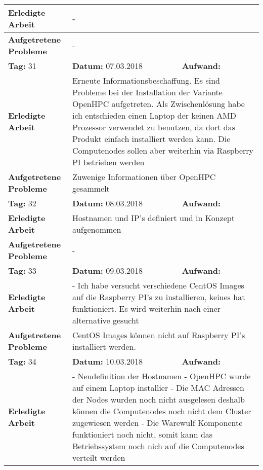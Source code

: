 \begin{longtable}{|p{5cm}|p{5cm}|p{6cm}|}
\textbf{Erledigte Arbeit} & \multicolumn{2}{p{11cm}|}{-} \\ \hline
\textbf{Aufgetretene Probleme} & \multicolumn{2}{p{11cm}|}{-} \\ \hline
\rowcolor{heading}\textbf{Tag:} 31 & \textbf{Datum:} 07.03.2018 & \textbf{Aufwand:} \\ \hline
\textbf{Erledigte Arbeit} & \multicolumn{2}{p{11cm}|}{Erneute Informationsbeschaffung. Es sind Probleme bei der Installation der Variante OpenHPC aufgetreten. Als Zwischenlösung habe ich entschieden einen Laptop der keinen AMD Prozessor verwendet zu benutzen, da dort das Produkt einfach installiert werden kann. Die Computenodes sollen aber weiterhin via Raspberry PI betrieben werden} \\ \hline
\textbf{Aufgetretene Probleme} & \multicolumn{2}{p{11cm}|}{Zuwenige Informationen über OpenHPC gesammelt} \\ \hline
\rowcolor{heading}\textbf{Tag:} 32 & \textbf{Datum:} 08.03.2018 & \textbf{Aufwand:} \\ \hline
\textbf{Erledigte Arbeit} & \multicolumn{2}{p{11cm}|}{Hostnamen und IP's definiert und in Konzept aufgenommen} \\ \hline
\textbf{Aufgetretene Probleme} & \multicolumn{2}{p{11cm}|}{-} \\ \hline
\rowcolor{heading}\textbf{Tag:} 33 & \textbf{Datum:} 09.03.2018 & \textbf{Aufwand:} \\ \hline
\textbf{Erledigte Arbeit} & \multicolumn{2}{p{11cm}|}{- Ich habe versucht verschiedene CentOS Images auf die Raspberry PI's zu installieren, keines hat funktioniert. Es wird weiterhin nach einer alternative gesucht} \\ \hline
\textbf{Aufgetretene Probleme} & \multicolumn{2}{p{11cm}|}{CentOS Images können nicht auf Raspberry PI's installiert werden.} \\ \hline
\rowcolor{heading}\textbf{Tag:} 34 & \textbf{Datum:} 10.03.2018 & \textbf{Aufwand:} \\ \hline
\textbf{Erledigte Arbeit} & \multicolumn{2}{p{11cm}|}{- Neudefinition der Hostnamen \newline
- OpenHPC wurde auf einem Laptop installier \newline
- Die MAC Adressen der Nodes wurden noch nicht ausgelesen deshalb können die Computenodes noch nicht dem Cluster zugewiesen werden \newline
- Die Warewulf Komponente funktioniert noch nicht, somit kann das Betriebssystem noch nich auf die Computenodes verteilt werden} \\ \hline

\end{longtable}
